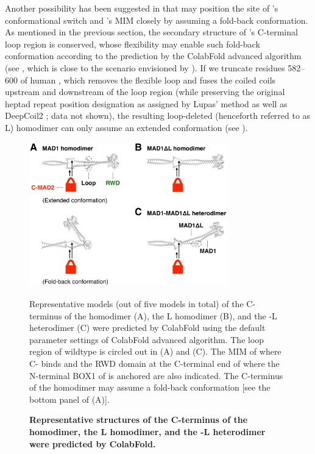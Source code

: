 Another possibility has been suggested in \cite{Structure1GO4, SpMad1} that  may position the site of 's conformational switch and 's MIM closely by assuming a fold-back conformation. As mentioned in the previous section, the secondary structure of 's C-terminal loop region is conserved, whose flexibility may enable such fold-back conformation according to the prediction by the ColabFold advanced algorithm (see , which is close to the scenario envisioned by \cite{SpMad1}). If we truncate residues 582--600 of human , which removes the flexible loop and fuses the coiled coils upstream and downstream of the loop region (while preserving the original heptad repeat position designation as assigned by Lupas' method \cite{LupasCOILS} as well as DeepCoil2 \cite{DeepCoil}; data not shown), the resulting loop-deleted  (henceforth referred to as \textDelta{}L) homodimer can only assume an extended conformation (see ).

\begin{figure}
    \centering
    \includegraphics[width=0.77\textwidth]{chapters/figures/ColabFoldPrediction.pdf}
    \caption{\textbf{Representative structures of the C-terminus of the  homodimer, the \textDelta{}L homodimer, and the -\textDelta{}L heterodimer were predicted by ColabFold.}}
    \noindent\justifying Representative models (out of five models in total) of the C-terminus of the  homodimer (A), the \textDelta{}L homodimer (B), and the -\textDelta{}L heterodimer (C) were predicted by ColabFold using the default parameter settings of ColabFold advanced algorithm. The loop region of wildtype  is circled out in (A) and (C). The MIM of  where C- binds and the RWD domain at the C-terminal end of  where the N-terminal BOX1 of  is anchored are also indicated. The C-terminus of the  homodimer may assume a fold-back conformation [see the bottom panel of (A)].
    \label{ColabFoldPrediction}
\end{figure}

